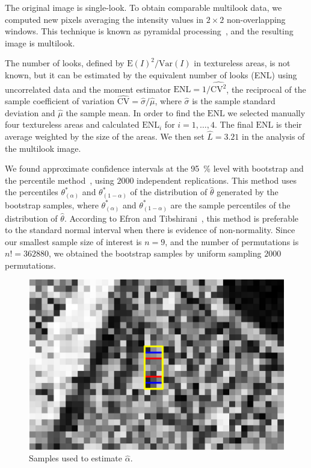 \documentclass[twocolumn]{svjour3}
\begin{document}
The original image is single-look.
To obtain comparable multilook data, we computed new pixels averaging the intensity values in $2\times2$ non-overlapping windows. This technique is known as pyramidal processing~\cite{Adelson1984}, and the resulting image is multilook.

The number of looks, defined by ${\text{E}(I)^2}/{\text{Var}(I)}$ in textureless areas, is not known, but it can be estimated by the equivalent number of looks (ENL) using uncorrelated data and the moment estimator
$\text{ENL}={1}/{\widehat{\text{CV}^2}}$, the reciprocal of the sample coefficient of variation $\widehat{\text{CV}}={\widehat{\sigma}}/{\widehat\mu}$, where $\widehat{\sigma}$ is the sample standard deviation and $\widehat\mu$ the sample mean.
In order to find the $\text{ENL}$ we selected manually four textureless areas and calculated $\text{ENL}_i$ for $i=1, \ldots, 4$. 
The final $\text{ENL}$ is their average weighted by the size of the areas. 
We then set $\widehat L=3.21$ in the analysis of the multilook image.

We found approximate confidence intervals at the \SI{95}{\percent} level with bootstrap and the percentile method~\cite{Davison1997}, using $2000$ independent replications.
This method uses the percentiles $\theta^*_{(\alpha)}$ and $\theta^*_{(1-\alpha)}$ of the distribution of $\widehat{\theta} $ generated by the bootstrap samples, where $\theta^*_{(\alpha)}$ and $\theta^*_{(1-\alpha)}$ are the sample percentiles of the distribution of $\widehat{\theta} $. 
According to Efron and Tibshirani~\cite{Efron93}, this method is preferable to the standard normal interval when there is evidence of non-normality.
Since our smallest sample size of interest is $n=9$, and the number of permutations is $n!=362880$, we obtained the bootstrap samples by uniform sampling $2000$ permutations.

\begin{figure}[hbt]
\centering
\includegraphics[width=0.8\linewidth]{TresMuestrasAgrandada}
\caption{Samples used to estimate $\widehat{\alpha}$.}\label{TresMuestras} 
\end{figure}
\end{document}
